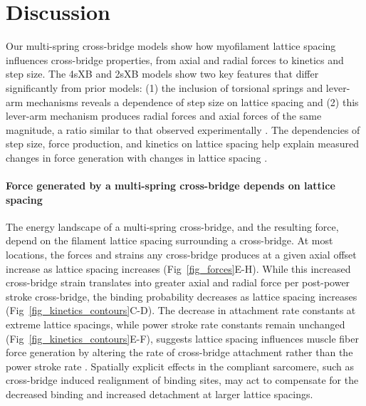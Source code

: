 \documentclass[10pt]{article}
\newcommand{\citep}[1]{\cite{#1}} %
\begin{document}


\section*{Discussion} %

Our multi-spring cross-bridge models show how myofilament lattice spacing influences cross-bridge properties, from axial and radial forces to kinetics and step size. 
The 4sXB and 2sXB models show two key features that differ significantly from prior models: (1) the inclusion of torsional springs and lever-arm mechanisms reveals a dependence of step size on lattice spacing and (2) this lever-arm mechanism produces radial forces and axial forces of the same magnitude, a ratio similar to that observed experimentally \citep{Maughan1981, Cecchi1990, Brenner1991}. 
The dependencies of step size, force production, and kinetics on lattice spacing help explain measured changes in force generation with changes in lattice spacing \citep{Millman1998}. 

\paragraph{Force generated by a multi-spring cross-bridge depends on lattice spacing} %
The energy landscape of a multi-spring cross-bridge, and the resulting force, depend on the filament lattice spacing surrounding a cross-bridge. 
At most locations, the forces and strains any cross-bridge produces at a given axial offset increase as lattice spacing increases (Fig~\ref{fig_forces}E-H). 
While this increased cross-bridge strain translates into greater axial and radial force per post-power stroke cross-bridge, the binding probability decreases as lattice spacing increases (Fig~\ref{fig_kinetics_contours}C-D).
The decrease in attachment rate constants at extreme lattice spacings, while power stroke rate constants remain unchanged (Fig~\ref{fig_kinetics_contours}E-F), suggests lattice spacing influences muscle fiber force generation by altering the rate of cross-bridge attachment rather than the power stroke rate \citep{Martyn2004}. 
Spatially explicit effects in the compliant sarcomere, such as cross-bridge induced realignment of binding sites, may act to compensate for the decreased binding and increased detachment at larger lattice spacings.
\end{document}
